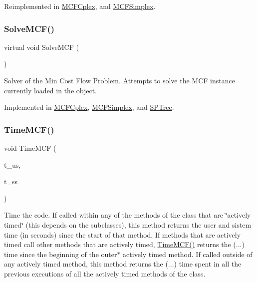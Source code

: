 Reimplemented in \mbox{\hyperlink{class_m_c_f_cplex_a64a55cf140fd8543ab0cf88cc052d8d7}{M\+C\+F\+Cplex}}, and \mbox{\hyperlink{class_m_c_f_simplex_ae6eb12cc8e2e124b236bf84ebeddab70}{M\+C\+F\+Simplex}}.

\mbox{\label{class_m_c_f_class_ac0d96429d896a2d878a5f057535ab1ee}} 
\subsubsection{\texorpdfstring{Solve\+M\+C\+F()}{SolveMCF()}}
{\footnotesize\ttfamily virtual void Solve\+M\+CF (\begin{DoxyParamCaption}\item[{void}]{ }\end{DoxyParamCaption})\hspace{0.3cm}{\ttfamily [pure virtual]}}

Solver of the Min Cost Flow Problem. Attempts to solve the M\+CF instance currently loaded in the object. 

Implemented in \mbox{\hyperlink{class_m_c_f_cplex_aea7d742cb19c17b17fb0832ea74cdb21}{M\+C\+F\+Cplex}}, \mbox{\hyperlink{class_m_c_f_simplex_aea7d742cb19c17b17fb0832ea74cdb21}{M\+C\+F\+Simplex}}, and \mbox{\hyperlink{class_s_p_tree_aea7d742cb19c17b17fb0832ea74cdb21}{S\+P\+Tree}}.

\mbox{\label{class_m_c_f_class_a779a8829874de569dc0e09f40b6cd569}} 
\subsubsection{\texorpdfstring{Time\+M\+C\+F()}{TimeMCF()}\hspace{0.1cm}{\footnotesize\ttfamily [1/2]}}
{\footnotesize\ttfamily void Time\+M\+CF (\begin{DoxyParamCaption}\item[{double \&}]{t\+\_\+us,  }\item[{double \&}]{t\+\_\+ss }\end{DoxyParamCaption})\hspace{0.3cm}{\ttfamily [inline]}}

Time the code. If called within any of the methods of the class that are \char`\"{}actively timed\char`\"{} (this depends on the subclasses), this method returns the user and sistem time (in seconds) since the start of that method. If methods that are actively timed call other methods that are actively timed, \mbox{\hyperlink{class_m_c_f_class_a25ce05b3fabc8d4f80332a02bce2a623}{Time\+M\+C\+F()}} returns the (...) time since the beginning of the outer$\ast$ actively timed method. If called outside of any actively timed method, this method returns the (...) time spent in all the previous executions of all the actively timed methods of the class.

